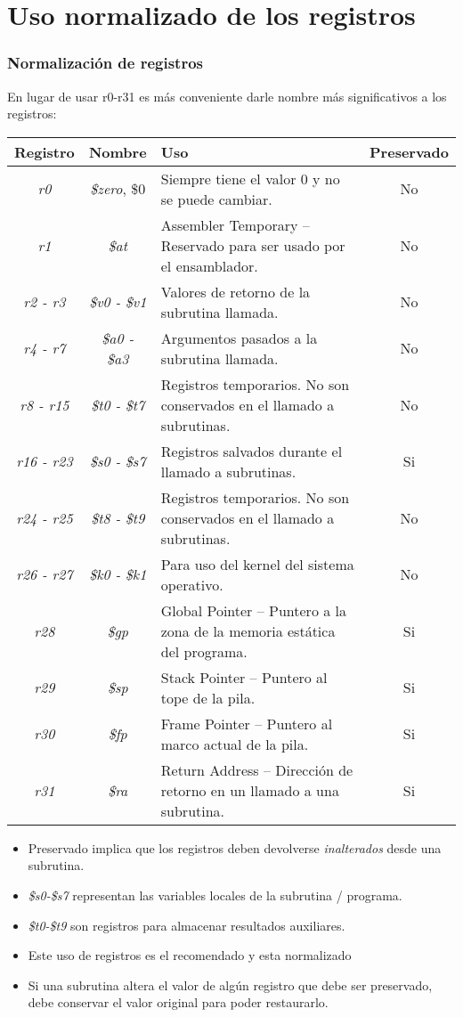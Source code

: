 \documentclass{beamer}
\begin{document}
\section{Uso normalizado de los registros}
\begin{frame}
\frametitle{Normalización de registros}
En lugar de usar r0-r31 es más conveniente darle nombre más significativos a los registros:
\tiny{
\begin{tabular}{| c | c | p{6.5cm} | c |}
\hline
Registro & Nombre & Uso & Preservado \\ \hline
\emph{r0} & \emph{\$zero}, {\$0} & Siempre tiene el valor 0 y no se puede cambiar. & No \\ \hline
\emph{r1} & \emph{\$at} & Assembler Temporary – Reservado para ser usado por el ensamblador. & No \\ \hline
\emph{r2 - r3} & \emph{\$v0 - \$v1} & Valores de retorno de la subrutina llamada. & No \\ \hline
\emph{r4 - r7} & \emph{\$a0 - \$a3} & Argumentos pasados a la subrutina llamada. & No \\ \hline
\emph{r8 - r15} & \emph{\$t0 - \$t7} & Registros temporarios. No son conservados en el llamado a subrutinas. & No \\ \hline
\emph{r16 - r23} & \emph{\$s0 - \$s7} &  Registros salvados durante el llamado a subrutinas. & Si \\ \hline
\emph{r24 - r25} & \emph{\$t8 - \$t9} & Registros temporarios. No son conservados en el llamado a subrutinas. & No \\ \hline
\emph{r26 - r27} & \emph{\$k0 - \$k1} & Para uso del kernel del sistema operativo. & No \\ \hline
\emph{r28} & \emph{\$gp} & Global Pointer – Puntero a la zona de la memoria estática del programa. & Si \\ \hline
\emph{r29} & \emph{\$sp} & Stack Pointer – Puntero al tope de la pila. & Si \\ \hline
\emph{r30} & \emph{\$fp} & Frame Pointer – Puntero al marco actual de la pila. & Si \\ \hline
\emph{r31} & \emph{\$ra} & Return Address – Dirección de retorno en un llamado a una subrutina. & Si \\ \hline
		
\end{tabular}	
}
\begin{itemize}
\item Preservado implica que los registros deben devolverse \emph{inalterados} desde una subrutina.
\item \emph{\$s0-\$s7} representan las variables locales de la subrutina / programa.
\item \emph{\$t0-\$t9} son registros para almacenar resultados auxiliares.
\item Este uso de registros es el recomendado y esta normalizado
\item Si una subrutina altera el valor de algún registro que debe ser preservado, debe conservar el valor original para poder restaurarlo.
\end{itemize}

\end{frame}
\end{document}
